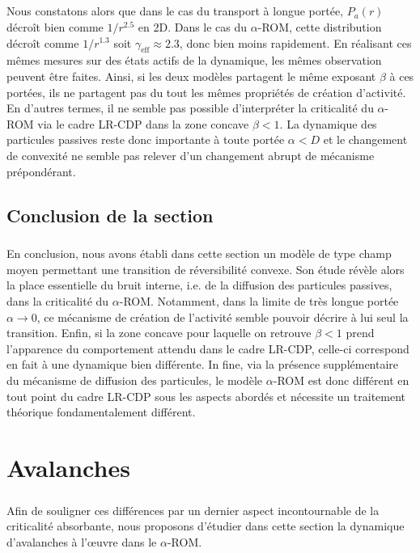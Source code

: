 \subparagraph{}Nous constatons alors que dans le cas du transport à longue portée, $P_a(r)$ décroît bien comme $1/r^{2.5}$ en 2D. Dans le cas du $\alpha$-ROM, cette distribution décroît comme $1/r^{1.3}$ soit $\gamma_\text{eff}\approx 2.3$, donc bien moins rapidement. En réalisant ces mêmes mesures sur des états actifs de la dynamique, les mêmes observation peuvent être faites. Ainsi, si les deux modèles partagent le même exposant $\beta$ à ces portées, ils ne partagent pas du tout les mêmes propriétés de création d'activité. En d'autres termes, il ne semble pas possible d'interpréter la criticalité du $\alpha$-ROM via le cadre LR-CDP  dans la zone concave $\beta < 1$. La dynamique des particules passives reste donc importante à toute portée $\alpha < D$ et le changement de convexité ne semble pas relever d'un changement abrupt de mécanisme prépondérant.

\subsection{Conclusion de la section}

\subparagraph{}En conclusion, nous avons établi dans cette section un modèle de type champ moyen permettant une transition de réversibilité convexe. Son étude révèle alors la place essentielle du bruit interne, i.e. de la diffusion des particules passives, dans la criticalité du $\alpha$-ROM. Notamment, dans la limite de très longue portée $\alpha\rightarrow 0$, ce mécanisme de création de l'activité semble pouvoir décrire à lui seul la transition. Enfin, si la zone concave pour laquelle on retrouve $\beta<1$ prend l'apparence du comportement attendu dans le cadre LR-CDP, celle-ci correspond en fait à une dynamique bien différente. In fine, via la présence supplémentaire du mécanisme de diffusion des particules, le modèle $\alpha$-ROM est donc différent en tout point du cadre LR-CDP sous les aspects abordés et nécessite un traitement théorique fondamentalement différent.

\section{Avalanches}

\subparagraph{}Afin de souligner ces différences par un dernier aspect incontournable de la criticalité absorbante, nous proposons d'étudier dans cette section la dynamique d'avalanches à l’œuvre dans le $\alpha$-ROM.

\label{sec:AvSusp}

